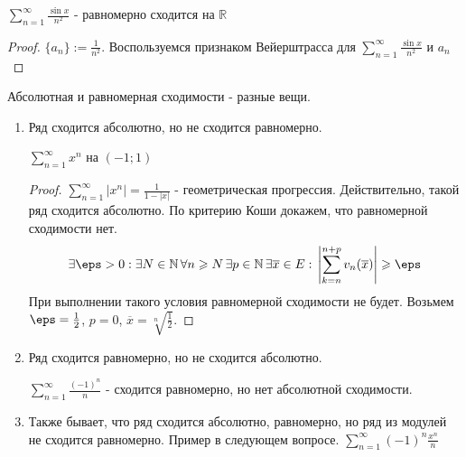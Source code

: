 \begin{example} \thmslashn

  $\sum\limits_{n = 1}^{\infty}{\frac{\sin{x}}{n^2}}$ - равномерно сходится на $\mathbb{R}$
  \begin{proof} \thmslashn

    $\{a_n\} := \frac{1}{n^2}$. Воспользуемся признаком Вейерштрасса для $\sum\limits_{n = 1}^{\infty}{\frac{\sin{x}}{n^2}} \text{ и } a_n$
  \end{proof}
\end{example}

\begin{remark} \thmslashn

  Абсолютная и равномерная сходимости - разные вещи.

  \begin{enumerate}
  \item
    Ряд сходится абсолютно, но не сходится равномерно.
    \begin{example} \thmslashn

      $\sum\limits_{n = 1}^{\infty}{x^n}$ на $(-1; 1)$
      \begin{proof} \thmslashn

        $\sum\limits_{n = 1}^{\infty}{|x^{n}|} = \frac{1}{1 - |x|}$  - геометрическая прогрессия. Действительно, такой ряд сходится абсолютно. По критерию Коши докажем, что равномерной сходимости нет.
        \[\begin{aligned}
          \exists \eps > 0 : \exists N \in \mathbb{N}\, \forall n \geqslant N \,\exists p \in \mathbb{N} \,\exists \overline{x} \in E: \,\left|\sum\limits_{k = n}^{n+p}{v_n(\overline{x})}\right| \geqslant \eps
        \end{aligned}\]
        При выполнении такого условия равномерной сходимости не будет. Возьмем $\eps = \frac{1}{2}$, $p = 0$, $\overline{x} = \sqrt[n]{\frac{1}{2}}$.
      \end{proof}
    \end{example}
  \item
    Ряд сходится равномерно, но не сходится абсолютно.
    \begin{example} \thmslashn

      $\sum\limits_{n = 1}^{\infty}{\frac{(-1)^n}{n}}$ - сходится равномерно, но нет абсолютной сходимости.
    \end{example}
  \item
    Также бывает, что ряд сходится абсолютно, равномерно, но ряд из модулей не сходится равномерно.
    Пример в следующем вопросе. $\sum\limits_{n = 1}^{\infty}{(-1)^n\frac{x^n}{n}}$
  \end{enumerate}
\end{remark}


